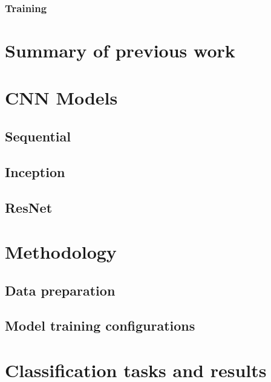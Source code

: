 \documentclass[12pt]{article}
\begin{document}
\subsubsection{Training}

\section{Summary of previous work}

\section{CNN Models}

\subsection{Sequential}

\subsection{Inception}

\subsection{ResNet}

\section{Methodology}

\subsection{Data preparation}

\subsection{Model training configurations}

\section{Classification tasks and results}
\end{document}
